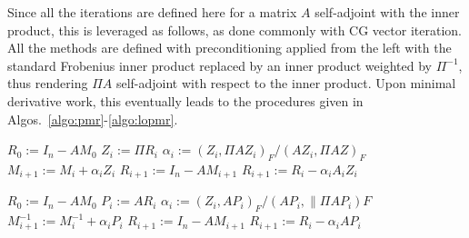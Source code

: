 \documentclass[numbers,webpdf,imanum]{ima-authoring-template}%
\theoremstyle{thmstyletwo}%
\numberwithin{equation}{section}
\begin{document}
Since all the iterations are defined here for a matrix $A$ self-adjoint with the inner product, this is leveraged as follows, as done commonly with CG vector iteration.
All the methods are defined with preconditioning applied from the left with the standard Frobenius inner product replaced by an inner product weighted by $\Pi^{-1}$, thus rendering $\Pi A$ self-adjoint with respect to the inner product.
Upon minimal derivative work, this eventually leads to the procedures given in Algos.~\ref{algo:pmr}-\ref{algo:lopmr}.

\begin{algorithm}[ht]
\caption{MR\_SPD($A$, $\Pi$, $M_0$, $\texttt{ExplicitResidualUpdate}$)}
\label{algo:pmr}
\begin{algorithmic}[1]
\Statex {}
\State $R_0:=I_n-AM_0$
\State $Z_i:=\Pi R_i$ 
\State $\alpha_i:=(Z_i,\Pi AZ_i)_F/(AZ_i,\Pi AZ)_F$
\State $M_{i+1}:=M_{i}+\alpha_i Z_{i}$
\State $R_{i+1}:=I_n-AM_{i+1}$
\Else
\State $R_{i+1}:=R_i-\alpha_iA_iZ_i$
\EndIf
\EndFor
\end{algorithmic}
\end{algorithm}

\begin{algorithm}[ht]
\caption{SD\_SPD($A$, $\Pi$, $M_0$, $\texttt{ExplicitResidualUpdate}$)}
\label{algo:preconditioned-steepest-descent}
\begin{algorithmic}[1]
\Statex {}
\State $R_0:=I_n-AM_0$
\State $P_{i}:=AR_{i}$
\State $\alpha_i:=(Z_i,AP_i)_F/(AP_i,\|\Pi AP_i)F$
\State $M_{i+1}^{-1}:=M_{i}^{-1}+\alpha_i P_{i}$
\State $R_{i+1}:=I_n-AM_{i+1}$
\Else
\State $R_{i+1}:=R_i-\alpha_iAP_i$
\EndIf
\EndFor
\end{algorithmic}
\end{algorithm}
\end{document}
